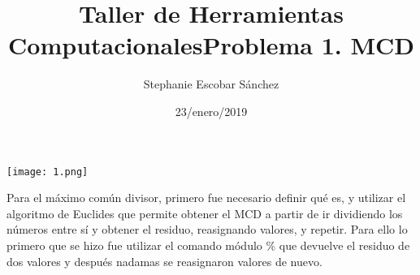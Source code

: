 \documentclass{article}
\title{\Huge Taller de Herramientas Computacionales}
\author{Stephanie Escobar Sánchez}
\date{23/enero/2019}
\begin{document}
	\maketitle
	\begin{center}
		\texttt{[image: 1.png]}	
	\end{center}
\newpage
	\begin{center}
		\title {\Huge Problema 1. MCD} 
	\end{center}


Para el máximo común divisor, primero fue necesario definir qué es, y utilizar el algoritmo de Euclides que permite obtener el MCD a partir de ir dividiendo los números entre sí y obtener el residuo, reasignando valores, y repetir. Para ello lo primero que se hizo fue utilizar el comando módulo \% que devuelve el residuo de dos valores y después nadamas se reasignaron valores de nuevo.
\end{document}
